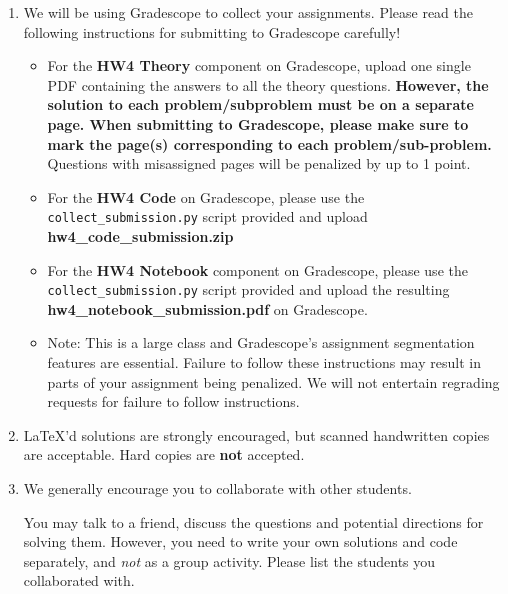 \documentclass[11pt,english]{article}
\begin{document}
\begin{enumerate}
\item We will be using Gradescope to collect your assignments.  Please read the following instructions for submitting to Gradescope carefully!
    \begin{itemize}
        \item
               For the \textbf{HW4 Theory} component on Gradescope, upload one single PDF containing the answers to all the theory questions. \textbf{However, the solution to each problem/subproblem must be on a separate page. When submitting to Gradescope, please make sure to mark the page(s) corresponding to each problem/sub-problem.} Questions with misassigned pages will be penalized by up to 1 point.
          \item
               For the \textbf{HW4 Code} on Gradescope, please use the \texttt{collect\_submission.py} script provided and upload \textbf{hw4\_code\_submission.zip}
          \item
               For the \textbf{HW4 Notebook} component on Gradescope, please use the \texttt{collect\_submission.py} script provided and upload the resulting \textbf{hw4\_notebook\_submission.pdf} on Gradescope.
          \item
               Note: This is a large class and Gradescope's assignment segmentation features are essential.
               Failure to follow these instructions may result in parts of your assignment being penalized.
               We will not entertain regrading requests for failure to follow instructions.
        
    \end{itemize}

    \item
    \LaTeX'd  solutions are strongly encouraged,
    but scanned handwritten copies are acceptable.
    Hard copies are \textbf{not} accepted.

    \item We generally encourage you to collaborate with other students.
    
    You may talk to a friend,
    discuss the questions and potential directions for solving them. However, you need to write
    your own solutions and code separately, and \emph{not} as a group activity.
    Please list the students you collaborated with. \\ \\

\end{enumerate}
\end{document}
